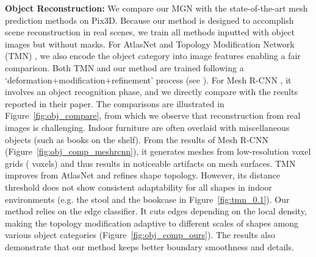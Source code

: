\documentclass[10pt,twocolumn,letterpaper]{article}
\begin{document}
\noindent \textbf{Object Reconstruction:} We compare our MGN with the state-of-the-art mesh prediction methods \cite{gkioxari2019mesh,groueix2018,Junyi} on Pix3D. 
Because our method is designed to accomplish scene reconstruction in real scenes, we train all methods inputted with object images but without masks. For AtlasNet \cite{groueix2018} and Topology Modification Network (TMN) \cite{Junyi}, we also encode the object category into image features enabling a fair comparison. Both TMN and our method are trained following a `deformation+modification+refinement' process (see \cite{Junyi}). For Mesh R-CNN \cite{gkioxari2019mesh}, it involves an object recognition phase, and we directly compare with the results reported in their paper. The comparisons are illustrated in Figure~\ref{fig:obj_compare}, from which we observe that reconstruction from real images is challenging. Indoor furniture are often overlaid with miscellaneous objects (such as books on the shelf). From the results of Mesh R-CNN (Figure~\ref{fig:obj_comp_meshrcnn}), it generates meshes from low-resolution voxel grids ( voxels) and thus results in noticeable artifacts on mesh surfaces. TMN improves from AtlasNet and refines shape topology. However, its distance threshold  does not show consistent adaptability for all shapes in indoor environments (e.g. the stool and the bookcase in Figure~\ref{fig:tmn_0.1}). Our method relies on the edge classifier. It cuts edges depending on the local density, making the topology modification adaptive to different scales of shapes among various object categories (Figure~\ref{fig:obj_comp_ours}). The results also demonstrate that our method keeps better boundary smoothness and details.
\end{document}
